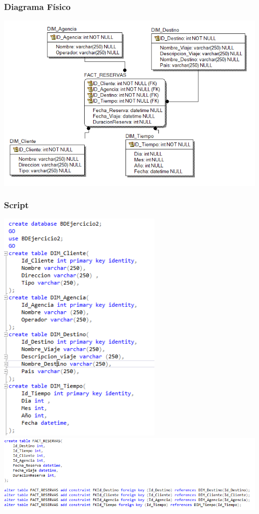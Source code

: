 \begin{itemize}
   \subsubsection{Diagrama Físico }
	
	\begin{center}
	\includegraphics[width=14cm]{./Imagenes/ejercicio2_fisico}
	\end{center}

 \subsubsection{Script }
\begin{center}
	\includegraphics[width=8cm]{./Imagenes/ej2_script1}
	\includegraphics[width=14cm]{./Imagenes/ej2_script2}
	\end{center}


\end{itemize}
